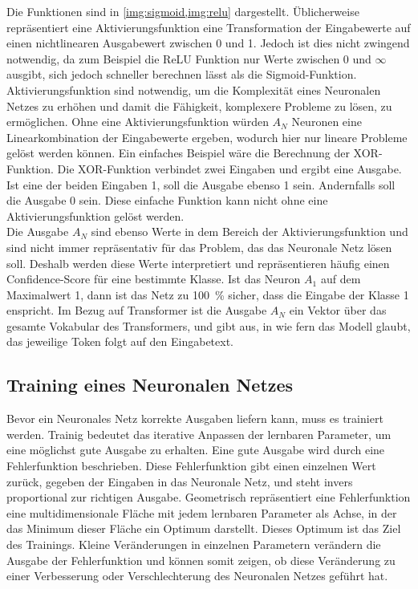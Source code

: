 Die Funktionen sind in \cref{img:sigmoid,img:relu} dargestellt.
Üblicherweise repräsentiert eine Aktivierungsfunktion eine Transformation der Eingabewerte auf einen nichtlinearen Ausgabewert zwischen 0 und 1.
Jedoch ist dies nicht zwingend notwendig, da zum Beispiel die ReLU Funktion nur Werte zwischen 0 und $\infty$ ausgibt, sich jedoch schneller berechnen lässt als die Sigmoid-Funktion.
Aktivierungsfunktion sind notwendig, um die Komplexität eines Neuronalen Netzes zu erhöhen und damit die Fähigkeit, komplexere Probleme zu lösen, zu ermöglichen.
Ohne eine Aktivierungsfunktion würden $A_N$ Neuronen eine Linearkombination der Eingabewerte ergeben, wodurch hier nur lineare Probleme gelöst werden können.
Ein einfaches Beispiel wäre die Berechnung der XOR-Funktion.
Die XOR-Funktion verbindet zwei Eingaben und ergibt eine Ausgabe. Ist eine der beiden Eingaben 1, soll die Ausgabe ebenso 1 sein.
Andernfalls soll die Ausgabe 0 sein.
Diese einfache Funktion kann nicht ohne eine Aktivierungsfunktion gelöst werden.\\

Die Ausgabe $A_N$ sind ebenso Werte in dem Bereich der Aktivierungsfunktion und sind nicht immer repräsentativ für das Problem, das das Neuronale Netz lösen soll.
Deshalb werden diese Werte interpretiert und repräsentieren häufig einen Confidence-Score für eine bestimmte Klasse.
Ist das Neuron $A_1$ auf dem Maximalwert 1, dann ist das Netz zu \SI{100}{\percent} sicher, dass die Eingabe der Klasse 1 enspricht.
Im Bezug auf Transformer ist die Ausgabe $A_N$ ein Vektor über das gesamte Vokabular des Transformers, und gibt aus, in wie fern das Modell glaubt, das jeweilige Token folgt auf den Eingabetext.\\

\subsection{Training eines Neuronalen Netzes}\label{subsec:grundlagen:training}
Bevor ein Neuronales Netz korrekte Ausgaben liefern kann, muss es trainiert werden.
Trainig bedeutet das iterative Anpassen der lernbaren Parameter, um eine möglichst gute Ausgabe zu erhalten.
Eine gute Ausgabe wird durch eine Fehlerfunktion beschrieben.
Diese Fehlerfunktion gibt einen einzelnen Wert zurück, gegeben der Eingaben in das Neuronale Netz, und steht invers proportional zur richtigen Ausgabe.
Geometrisch repräsentiert eine Fehlerfunktion eine multidimensionale Fläche mit jedem lernbaren Parameter als Achse, in der das Minimum dieser Fläche ein Optimum darstellt.
Dieses Optimum ist das Ziel des Trainings.
Kleine Veränderungen in einzelnen Parametern verändern die Ausgabe der Fehlerfunktion und können somit zeigen, ob diese Veränderung zu einer Verbesserung oder Verschlechterung des Neuronalen Netzes geführt hat.\\

